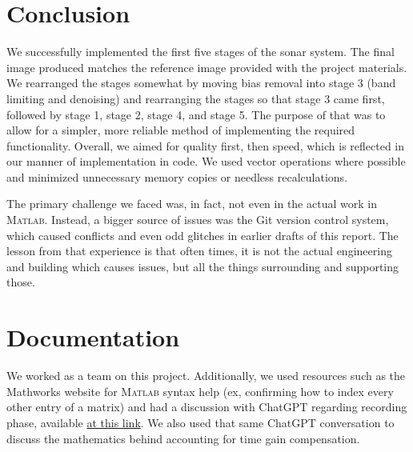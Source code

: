 
\section{Conclusion}
We successfully implemented the first five stages of the sonar system. The final image produced matches the
 reference image provided with the project materials. We rearranged the stages somewhat by moving bias removal
 into stage 3 (band limiting and denoising) and rearranging the stages so that stage 3 came first, followed by
 stage 1, stage 2, stage 4, and stage 5. The purpose of that was to allow for a simpler, more reliable method
 of implementing the required functionality. Overall, we aimed for quality first, then speed, which is reflected
 in our manner of implementation in code. We used vector operations where possible and minimized unnecessary
 memory copies or needless recalculations.

The primary challenge we faced was, in fact, not even in the actual work in \textsc{Matlab}. Instead, a bigger source of
 issues was the Git version control system, which caused conflicts and even odd glitches in earlier drafts of
 this report. The lesson from that experience is that often times, it is not the actual engineering and building
 which causes issues, but all the things surrounding and supporting those.

\section*{Documentation}
We worked as a team on this project.  Additionally, we used resources such as the Mathworks website for \textsc{Matlab} syntax help (ex, confirming how to index every other entry of a matrix) and had a discussion with ChatGPT regarding recording phase, available \href{https://chatgpt.com/c/673ff615-bf94-800b-a437-6f861b769c24}{at this link}.  We also used that same ChatGPT conversation to discuss the mathematics behind accounting for time gain compensation.